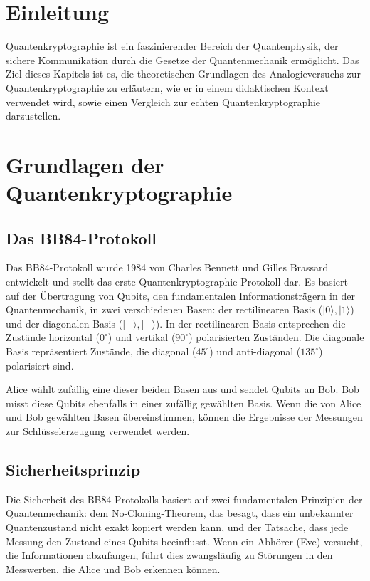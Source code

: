 \section{Einleitung}
Quantenkryptographie ist ein faszinierender Bereich der Quantenphysik, der sichere Kommunikation durch die Gesetze der Quantenmechanik ermöglicht. Das Ziel dieses Kapitels ist es, die theoretischen Grundlagen des Analogieversuchs zur Quantenkryptographie zu erläutern, wie er in einem didaktischen Kontext verwendet wird, sowie einen Vergleich zur echten Quantenkryptographie darzustellen.

\section{Grundlagen der Quantenkryptographie}
\subsection{Das BB84-Protokoll}
Das BB84-Protokoll wurde 1984 von Charles Bennett und Gilles Brassard entwickelt und stellt das erste Quantenkryptographie-Protokoll dar. Es basiert auf der Übertragung von Qubits, den fundamentalen Informationsträgern in der Quantenmechanik, in zwei verschiedenen Basen: der rectilinearen Basis (\( |0\rangle, |1\rangle \)) und der diagonalen Basis (\( |+\rangle, |-\rangle \)). In der rectilinearen Basis entsprechen die Zustände horizontal (\(0^\circ\)) und vertikal (\(90^\circ\)) polarisierten Zuständen. Die diagonale Basis repräsentiert Zustände, die diagonal (\(45^\circ\)) und anti-diagonal (\(135^\circ\)) polarisiert sind.

Alice wählt zufällig eine dieser beiden Basen aus und sendet Qubits an Bob. Bob misst diese Qubits ebenfalls in einer zufällig gewählten Basis. Wenn die von Alice und Bob gewählten Basen übereinstimmen, können die Ergebnisse der Messungen zur Schlüsselerzeugung verwendet werden.

\subsection{Sicherheitsprinzip}
Die Sicherheit des BB84-Protokolls basiert auf zwei fundamentalen Prinzipien der Quantenmechanik: dem No-Cloning-Theorem, das besagt, dass ein unbekannter Quantenzustand nicht exakt kopiert werden kann, und der Tatsache, dass jede Messung den Zustand eines Qubits beeinflusst. Wenn ein Abhörer (Eve) versucht, die Informationen abzufangen, führt dies zwangsläufig zu Störungen in den Messwerten, die Alice und Bob erkennen können.

